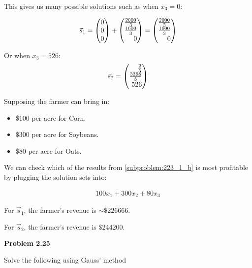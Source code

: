 \documentclass[12pt]{article}
\newenvironment{problem}[1][default]{
  \begin{framed}\begin{minipage}{0.97\textwidth}
  \setlength{\parskip}{4mm}
  {\bf Problem #1}
}{\end{minipage}\end{framed}}
\newenvironment{abc}{\begin{enumerate}[label={\bf(\alph*)}]}{\end{enumerate}}
\newcommand\m[2][]{
	\ifthenelse{\equal {#1} {}}
		{\begin{pmatrix*}[r]#2\end{pmatrix*}}
		{\left(\begin{array}{#1}#2\end{array}\right)}
}
\begin{document}
\begin{abc}
\begin{item}
	This gives us many possible solutions such as when $x_3 = 0$:

	\begin{equation}
	\begin{aligned}
		\vec{s}_1 = \m{0 \\ 0 \\ 0} + \m{\frac{2000}{3} \\ \frac{1600}{3} \\ 0} = \m{\frac{2000}{3} \\ \frac{1600}{3} \\ 0}
	\end{aligned}
	\end{equation}

	Or when $x_3 = 526$:
	\begin{equation}
	\begin{aligned}
		\vec{s}_2 = \m{\frac{2}{5} \\ \frac{3368}{5} \\ 526}
	\end{aligned}
	\end{equation}
	\end{item}

	\begin{item}
	Supposing the farmer can bring in:

	\begin{itemize}
		\item \$100 per acre for Corn.
		\item \$300 per acre for Soybeans.
		\item \$80 per acre for Oats.
	\end{itemize}

	We can check which of the results from \ref{subproblem:223_1_b} is most 
	profitable by plugging the solution sets into:

	\begin{equation}
	\begin{aligned}
		100x_1 + 300x_2 + 80x_3
	\end{aligned}
	\end{equation}

	For $\vec{s}_1$, the farmer's revenue is $\sim\$226666$.

	For $\vec{s}_2$, the farmer's revenue is $\$244200$.

	\end{item}
\end{abc}

\begin{problem}[2.25]
	Solve the following using Gauss' method
\end{problem}
\end{document}
